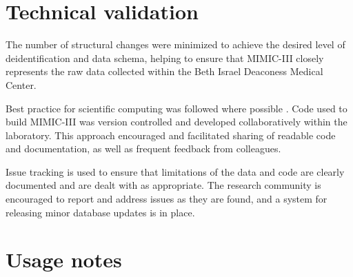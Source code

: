 \documentclass[english]{article}
\begin{document}
\section*{Technical validation}


The number of structural changes were minimized to achieve the desired level of deidentification and data schema, helping to ensure that MIMIC-III closely represents the raw data collected within the Beth Israel Deaconess Medical Center.

Best practice for scientific computing was followed where possible \cite{cite4}. Code used to build MIMIC-III was version controlled and developed collaboratively within the laboratory. This approach encouraged and facilitated sharing of readable code and documentation, as well as frequent feedback from colleagues.

Issue tracking is used to ensure that limitations of the data and code are clearly documented and are dealt with as appropriate. The research community is encouraged to report and address issues as they are found, and a system for releasing minor database updates is in place.



\section*{Usage notes}

\end{document}
